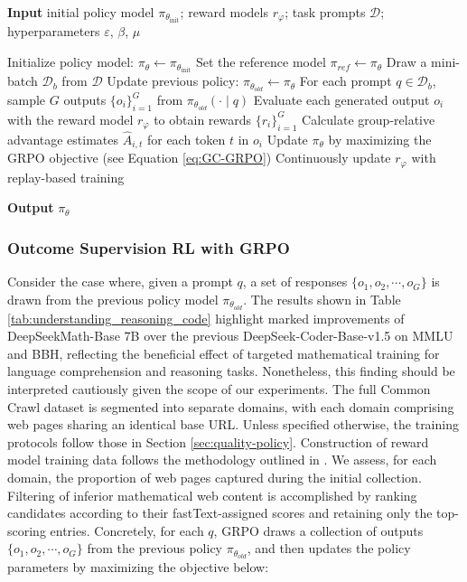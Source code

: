 \begin{itemize}[topsep=0pt]
\begin{itemize}[topsep=0pt]
\begin{itemize}[topsep=0pt]
\begin{itemize}
\begin{algorithm}[t]
  \small
  \caption{Iterative Group Relative Policy Optimization}
  \textbf{Input} initial policy model $\pi_{\theta_{\text{init}}}$; reward models $r_\varphi$; task prompts $\mathcal{D}$; 
  hyperparameters $\varepsilon$, $\beta$, $\mu$
  \begin{algorithmic}[1]
    \State Initialize policy model: $\pi_\theta \leftarrow \pi_{\theta_{\text{init}}}$
       \State Set the reference model $\pi_{ref} \leftarrow \pi_{\theta}$
      \State Draw a mini-batch $\mathcal{D}_b$ from $\mathcal{D}$
      \State Update previous policy: $\pi_{\theta_{old}} \leftarrow \pi_{\theta}$ 
      \State For each prompt $q \in \mathcal{D}_b$, sample $G$ outputs $\{o_i\}_{i=1}^G$ from $\pi_{\theta_{old}} (\cdot \mid q)$
      \State Evaluate each generated output $o_i$ with the reward model $r_{\varphi}$ to obtain rewards $\{r_i\}_{i=1}^G$
      \State Calculate group-relative advantage estimates $\hat{A}_{i,t}$ for each token $t$ in $o_i$
        \State Update $\pi_{\theta}$ by maximizing the GRPO objective (see Equation \ref{eq:GC-GRPO})
      \EndFor
    \EndFor
    \State Continuously update $r_\varphi$ with replay-based training
    \EndFor 
  \end{algorithmic}
  \textbf{Output} $\pi_\theta$
  \label{alg:iter-grpo}
\end{algorithm}

\subsubsection{Outcome Supervision RL with GRPO} 
Consider the case where, given a prompt $q$, a set of responses $\{o_1, o_2, \cdots, o_G\}$ is drawn from the previous policy model $\pi_{\theta_{old}}$. The results shown in Table \ref{tab:understanding_reasoning_code} highlight marked improvements of DeepSeekMath-Base 7B over the previous DeepSeek-Coder-Base-v1.5 \citep{deepseek-coder} on MMLU and BBH, reflecting the beneficial effect of targeted mathematical training for language comprehension and reasoning tasks. Nonetheless, this finding should be interpreted cautiously given the scope of our experiments. The full Common Crawl dataset is segmented into separate domains, with each domain comprising web pages sharing an identical base URL. Unless specified otherwise, the training protocols follow those in Section \ref{sec:quality-policy}. Construction of reward model training data follows the methodology outlined in \citep{wang2023math}. We assess, for each domain, the proportion of web pages captured during the initial collection. Filtering of inferior mathematical web content is accomplished by ranking candidates according to their fastText-assigned scores and retaining only the top-scoring entries. Concretely, for each $q$, GRPO draws a collection of outputs $\{o_1, o_2, \cdots, o_G\}$ from the previous policy $\pi_{\theta_{old}}$, and then updates the policy parameters by maximizing the objective below:


\end{itemize}
\end{itemize}
\end{itemize}
\end{itemize}
